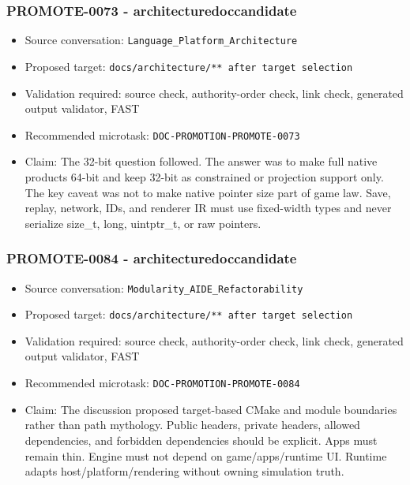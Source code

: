 \documentclass[9pt,a4paper,openany]{book}
\begin{document}
\subsubsection{PROMOTE-0073 - architecturedoccandidate}

\begin{itemize}
\item Source conversation: \texttt{Language\_\allowbreak{}Platform\_\allowbreak{}Architecture}
\item Proposed target: \texttt{docs/\allowbreak{}architecture/\allowbreak{}** after target selection}
\item Validation required: source check, authority-\allowbreak{}order check, link check, generated output validator, FAST
\item Recommended microtask: \texttt{DOC-\allowbreak{}PROMOTION-\allowbreak{}PROMOTE-\allowbreak{}0073}
\item Claim: The 32-\allowbreak{}bit question followed.\allowbreak{} The answer was to make full native products 64-\allowbreak{}bit and keep 32-\allowbreak{}bit as constrained or projection support only.\allowbreak{} The key caveat was not to make native pointer size part of game law.\allowbreak{} Save, replay, network, IDs, and renderer IR must use fixed-\allowbreak{}width types and never serialize size\_\allowbreak{}t, long, uintptr\_\allowbreak{}t, or raw pointers.\allowbreak{}
\end{itemize}

\subsubsection{PROMOTE-0084 - architecturedoccandidate}

\begin{itemize}
\item Source conversation: \texttt{Modularity\_\allowbreak{}AIDE\_\allowbreak{}Refactorability}
\item Proposed target: \texttt{docs/\allowbreak{}architecture/\allowbreak{}** after target selection}
\item Validation required: source check, authority-\allowbreak{}order check, link check, generated output validator, FAST
\item Recommended microtask: \texttt{DOC-\allowbreak{}PROMOTION-\allowbreak{}PROMOTE-\allowbreak{}0084}
\item Claim: The discussion proposed target-\allowbreak{}based CMake and module boundaries rather than path mythology.\allowbreak{} Public headers, private headers, allowed dependencies, and forbidden dependencies should be explicit.\allowbreak{} Apps must remain thin.\allowbreak{} Engine must not depend on game/\allowbreak{}apps/\allowbreak{}runtime UI.\allowbreak{} Runtime adapts host/\allowbreak{}platform/\allowbreak{}rendering without owning simulation truth.\allowbreak{}
\end{itemize}
\end{document}
